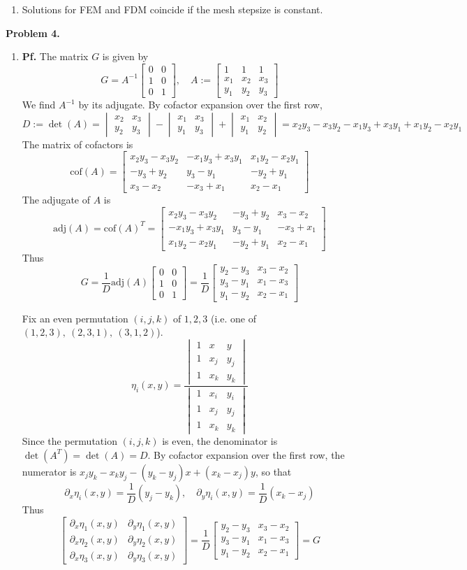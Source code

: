 \documentclass{article}
\def\tbf#1{\textbf{#1}}
\newcommand{\m}[2][b]{\begin{#1matrix}#2\end{#1matrix}}
\newcommand{\inv}{^{-1}}
\newcommand{\pf}{\tbf{Pf. }}
\newcommand{\ptl}{\partial}
\begin{document}
\begin{enumerate}[label=(\alph*)]
\item Solutions for FEM and FDM coincide if the mesh stepsize is constant.

\end{enumerate}


\tbf{Problem 4.}

\begin{enumerate}[label=(\alph*)]
	
\item \pf The matrix $G$ is given by
$$G = A\inv \m{0 & 0 \\ 1 & 0 \\ 0 & 1},
\quad A := \m{1 & 1 & 1 \\ x_1 & x_2 & x_3 \\ y_1 & y_2 & y_3}$$
We find $A\inv$ by its adjugate. By cofactor expansion over the first row,
$$D := \det(A)
= \m[v]{x_2 & x_3 \\ y_2 & y_3} - \m[v]{x_1 & x_3 \\ y_1 & y_3} + \m[v]{x_1 & x_2 \\ y_1 & y_2}
= x_2y_3 - x_3y_2 - x_1y_3 + x_3y_1 + x_1y_2 - x_2y_1$$
The matrix of cofactors is
$$\mathrm{cof}(A) = \m{x_2y_3-x_3y_2 & -x_1y_3+x_3y_1 & x_1y_2-x_2y_1 \\ -y_3+y_2 & y_3-y_1 & -y_2+y_1 \\ x_3-x_2 & -x_3+x_1 & x_2-x_1}$$
The adjugate of $A$ is
$$\mathrm{adj}(A) = \mathrm{cof}(A)^T
= \m{x_2y_3-x_3y_2 & -y_3+y_2  & x_3-x_2 \\ -x_1y_3+x_3y_1& y_3-y_1 & -x_3+x_1 \\ x_1y_2-x_2y_1 & -y_2+y_1 & x_2-x_1}$$
Thus
$$G = \frac{1}{D}\mathrm{adj}(A)\m{0 & 0 \\ 1 & 0 \\ 0 & 1}
= \frac{1}{D}\m{y_2-y_3 & x_3-x_2 \\ y_3-y_1 & x_1-x_3 \\ y_1-y_2 & x_2-x_1}$$

Fix an even permutation $(i,j,k)$ of $1,2,3$ (i.e. one of $(1,2,3),~(2,3,1),~(3,1,2)$).
$$\eta_i(x,y) = \frac{\m[v]{1 & x & y \\ 1 & x_j & y_j \\ 1 & x_k & y_k}}{\m[v]{1 & x_i & y_i \\ 1 & x_j & y_j \\ 1 & x_k & y_k}}$$
Since the permutation $(i,j,k)$ is even, the denominator is $\det(A^T)=\det(A)=D$. By cofactor expansion over the first row, the numerator is $x_jy_k - x_ky_j - (y_k - y_j)x + (x_k - x_j)y$, so that
$$\ptl_x\eta_i(x,y) = \frac{1}{D}(y_j-y_k),
\quad \ptl_y\eta_i(x,y) = \frac{1}{D}(x_k-x_j)$$
Thus
$$\m{\ptl_x\eta_1(x,y) & \ptl_y\eta_1(x,y) \\ \ptl_x\eta_2(x,y) & \ptl_y\eta_2(x,y) \\ \ptl_x\eta_3(x,y) & \ptl_y\eta_3(x,y)}
= \frac{1}{D}\m{y_2-y_3 & x_3-x_2 \\ y_3-y_1 & x_1-x_3 \\ y_1-y_2 & x_2-x_1}
= G$$



\end{enumerate}
\end{document}
